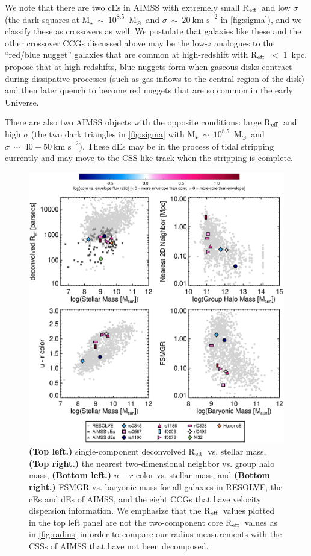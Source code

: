 \documentclass[iop,apj]{emulateapj}
\newcommand{\Reff}{R$_{\rm eff}$}
\newcommand{\Msun}{M$_{\odot}$}
\begin{document}
We note that there are two cEs in AIMSS with extremely small \Reff\ and low $\sigma$ (the dark squares at M$_{\star}~\sim~10^{8.5}$~\Msun\ and $\sigma~\sim~20~\text{km~s}^{-2}$ in \autoref{fig:sigma}), and we classify these as crossovers as well. We postulate that galaxies like these and the other crossover CCGs discussed above may be the low-$z$ analogues to the ``red/blue nugget'' galaxies that are common at high-redshift with \Reff~$<~1$~kpc. \citet{Dekel2013} propose that at high redshifts, blue nuggets form when gaseous disks contract during dissipative processes (such as gas inflows to the central region of the disk) and then later quench to become red nuggets that are so common in the early Universe.

There are also two AIMSS objects with the opposite conditions: large \Reff\ and high $\sigma$ (the two dark triangles in \autoref{fig:sigma} with M$_{\star}~\sim~10^{8.5}$~\Msun\ and $\sigma~\sim~40-50~\text{km~s}^{-2}$). These dEs may be in the process of tidal stripping currently and may move to the CSS-like track when the stripping is complete.

\begin{figure}[b]
\begin{center}
\includegraphics[scale=0.7]{miniplots.eps}
\caption{\textbf{(Top left.)} single-component deconvolved \Reff\ vs. stellar mass, \textbf{(Top right.)} the nearest two-dimensional neighbor vs. group halo mass, \textbf{(Bottom left.)} $u-r$ color vs. stellar mass, and \textbf{(Bottom right.)} FSMGR vs. baryonic mass for all galaxies in RESOLVE, the cEs and dEs of AIMSS, and the eight CCGs that have velocity dispersion information. We emphasize that the \Reff\ values plotted in the top left panel are not the two-component core \Reff\ values as in \autoref{fig:radius} in order to compare our radius measurements with the CSSs of AIMSS that have not been decomposed.}
\label{fig:miniplots}
\end{center}
\end{figure}
\end{document}
